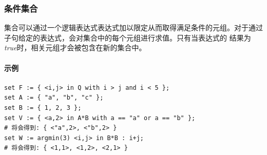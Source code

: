 \subsubsection{条件集合}
集合可以通过一个逻辑表达式表达式加以限定从而取得满足条件的元组。对于通过
子句给定的表达式，会对集合中的每个元组进行求值。只有当表达式的
结果为\emph{true}时，相关元组才会被包含在新的集合中。

\paragraph{示例}
{\small
\begin{verbatim}
set F := { <i,j> in Q with i > j and i < 5 };
set A := { "a", "b", "c" };
set B := { 1, 2, 3 };
set V := { <a,2> in A*B with a == "a" or a == "b" };
# 将会得到: { <"a",2>, <"b",2> }
set W := argmin(3) <i,j> in B*B : i+j;
# 将会得到: { <1,1>, <1,2>, <2,1> }
\end{verbatim}
}

